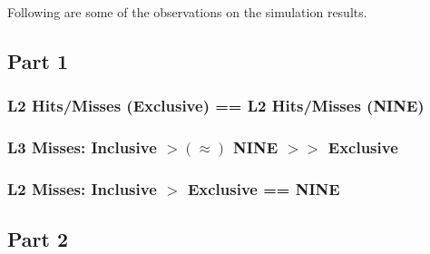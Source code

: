     Following are some of the observations on the simulation results.
\subsection{Part 1}
\subsubsection{L2 Hits/Misses (Exclusive) == L2 Hits/Misses (NINE)}

\subsubsection{L3 Misses: Inclusive $ >(\approx)$ NINE $>>$ Exclusive}

\subsubsection{L2 Misses: Inclusive $>$ Exclusive == NINE}

\subsection{Part 2}